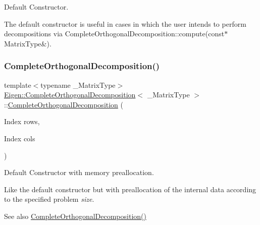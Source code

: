 Default Constructor. 

The default constructor is useful in cases in which the user intends to perform decompositions via {\ttfamily Complete\+Orthogonal\+Decomposition\+::compute(const$\ast$ Matrix\+Type\&)}. \mbox{\label{class_eigen_1_1_complete_orthogonal_decomposition_aa6c282dd7452ebe754024edb71bebd09}} 
\subsubsection{\texorpdfstring{CompleteOrthogonalDecomposition()}{CompleteOrthogonalDecomposition()}\hspace{0.1cm}{\footnotesize\ttfamily [2/4]}}
{\footnotesize\ttfamily template$<$typename \+\_\+\+Matrix\+Type$>$ \\
\mbox{\hyperlink{class_eigen_1_1_complete_orthogonal_decomposition}{Eigen\+::\+Complete\+Orthogonal\+Decomposition}}$<$ \+\_\+\+Matrix\+Type $>$\+::\mbox{\hyperlink{class_eigen_1_1_complete_orthogonal_decomposition}{Complete\+Orthogonal\+Decomposition}} (\begin{DoxyParamCaption}\item[{Index}]{rows,  }\item[{Index}]{cols }\end{DoxyParamCaption})\hspace{0.3cm}{\ttfamily [inline]}}



Default Constructor with memory preallocation. 

Like the default constructor but with preallocation of the internal data according to the specified problem {\itshape size}. \begin{DoxySeeAlso}{See also}
\mbox{\hyperlink{class_eigen_1_1_complete_orthogonal_decomposition_a7ba33814fd3fdc62f6179cdcd655c679}{Complete\+Orthogonal\+Decomposition()}} 
\end{DoxySeeAlso}
\mbox{\label{class_eigen_1_1_complete_orthogonal_decomposition_afcfaf7a395f853247c23bb52b1ffb1cc}} 
